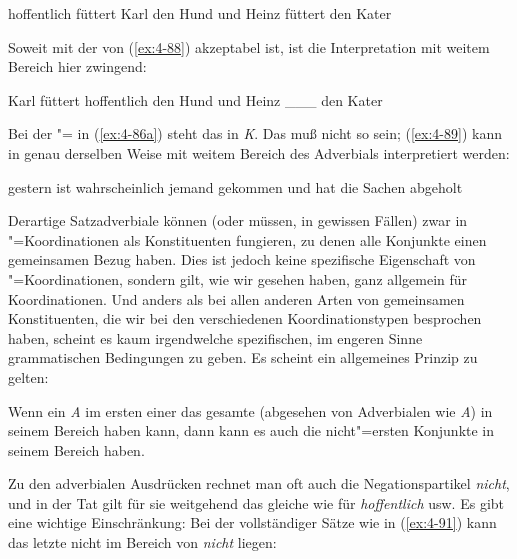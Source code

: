 \documentclass[output=paper]{langsci/langscibook}
\begin{document}
\begin{exe}
\ex%
\label{ex:4-87}
hoffentlich füttert Karl den Hund und Heinz füttert den Kater
\end{exe}
Soweit  mit der  von (\ref{ex:4-88}) akzeptabel ist, ist die Interpretation mit weitem Bereich hier zwingend:

\begin{exe}
\ex%
\label{ex:4-88}
Karl füttert hoffentlich den Hund und Heinz \_\_\_ den Kater
\end{exe}
\addlines[2]
Bei der "= in (\ref{ex:4-86a}) steht das  in \textit{K}. Das muß nicht so sein; (\ref{ex:4-89}) kann in genau derselben Weise mit weitem Bereich des Adverbials interpretiert werden:


\begin{exe}
\ex%
\label{ex:4-89}
gestern ist wahrscheinlich jemand gekommen und hat die Sachen abgeholt
\end{exe}
Derartige Satzadverbiale können (oder müssen, in gewissen Fällen) zwar in "=Koordinationen als Konstituenten fungieren, zu denen alle Konjunkte einen gemeinsamen Bezug haben. Dies ist jedoch keine spezifische Eigenschaft von "=Koordinationen, sondern gilt, wie wir gesehen haben, ganz allgemein für Koordinationen. Und anders als bei allen anderen Arten von gemeinsamen Konstituenten, die wir bei den verschiedenen Koordinationstypen besprochen haben, scheint es kaum irgendwelche spezifischen, im engeren Sinne grammatischen Bedingungen zu geben. Es scheint ein allgemeines Prinzip zu gelten:

\begin{exe}
\ex%
\label{ex:4-90}
Wenn ein  \textit{A} im ersten  einer  das gesamte  (abgesehen von Adverbialen wie \textit{A}) in seinem Bereich haben kann, dann kann es auch die nicht"=ersten Konjunkte in seinem Bereich haben.
\end{exe}
Zu den adverbialen Ausdrücken rechnet man oft auch die Negationspartikel \textit{nicht}, und in der Tat gilt für sie weitgehend das gleiche wie für \textit{hoffentlich} usw. Es gibt eine wichtige Einschränkung: Bei der  vollständiger Sätze wie in (\ref{ex:4-91}) kann das letzte  nicht im Bereich von \textit{nicht} liegen:
\end{document}
